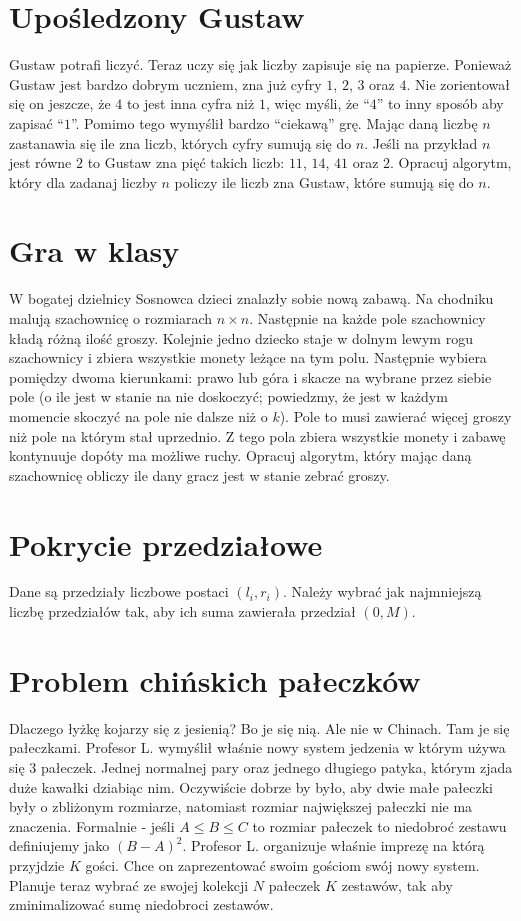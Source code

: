 \section*{Upośledzony Gustaw}

Gustaw potrafi liczyć.
Teraz uczy się jak liczby zapisuje się na papierze.
Ponieważ Gustaw jest bardzo dobrym uczniem, zna już cyfry $1$, $2$, $3$ oraz $4$.
Nie zorientował się on jeszcze, że $4$ to jest inna cyfra niż $1$, więc myśli, że ``$4$'' to inny sposób aby zapisać ``$1$''.
Pomimo tego wymyślił bardzo ``ciekawą'' grę.
Mając daną liczbę $n$ zastanawia się ile zna liczb, których cyfry sumują się do $n$.
Jeśli na przykład $n$ jest równe $2$ to Gustaw zna pięć takich liczb: $11$, $14$, $41$ oraz $2$.
Opracuj algorytm, który dla zadanaj liczby $n$ policzy ile liczb zna Gustaw, które sumują się do $n$.

\section*{Gra w klasy}

W bogatej dzielnicy Sosnowca dzieci znalazły sobie nową zabawą.
Na chodniku malują szachownicę o rozmiarach $n \times n$.
Następnie na każde pole szachownicy kładą różną ilość groszy.
Kolejnie jedno dziecko staje w dolnym lewym rogu szachownicy i zbiera wszystkie monety leżące na tym polu.
Następnie wybiera pomiędzy dwoma kierunkami: prawo lub góra i skacze na wybrane przez siebie pole
(o ile jest w stanie na nie doskoczyć; powiedzmy, że jest w każdym momencie skoczyć na pole nie dalsze niż o $k$).
Pole to musi zawierać więcej groszy niż pole na którym stał uprzednio.
Z tego pola zbiera wszystkie monety i zabawę kontynuuje dopóty ma możliwe ruchy.
Opracuj algorytm, który mając daną szachownicę obliczy ile dany gracz jest w stanie zebrać groszy.

\section*{Pokrycie przedziałowe}

Dane są przedziały liczbowe postaci $(l_i, r_i)$.
Należy wybrać jak najmniejszą liczbę przedziałów tak, aby ich suma zawierała przedział $(0, M)$.

\section*{Problem chińskich pałeczków}

Dlaczego łyżkę kojarzy się z jesienią?
Bo je się nią.
Ale nie w Chinach.
Tam je się pałeczkami.
Profesor L. wymyślił właśnie nowy system jedzenia w którym używa się $3$ pałeczek.
Jednej normalnej pary oraz jednego długiego patyka, którym zjada duże kawałki dziabiąc nim.
Oczywiście dobrze by było, aby dwie małe pałeczki były o zbliżonym rozmiarze, natomiast rozmiar największej pałeczki nie ma znaczenia.
Formalnie - jeśli $A \leq B \leq C$ to rozmiar pałeczek to niedobroć zestawu definiujemy jako $(B-A)^2$.
Profesor L. organizuje właśnie imprezę na którą przyjdzie $K$ gości.
Chce on zaprezentować swoim gościom swój nowy system.
Planuje teraz wybrać ze swojej kolekcji $N$ pałeczek $K$ zestawów, tak aby zminimalizować sumę niedobroci zestawów.

